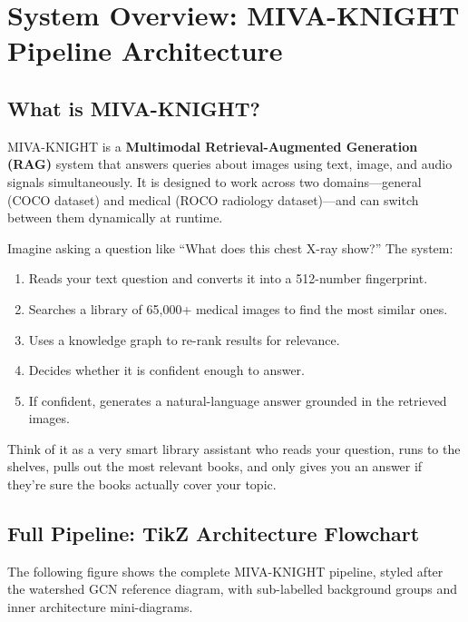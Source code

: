 \documentclass[12pt,a4paper]{article}
\newenvironment{plainbox}[1][Plain Language]{%
  \begin{tcolorbox}[
    enhanced, breakable,
    colback=lightpurplebox!40, colframe=purple!50,
    fonttitle=\bfseries\color{purple!70!black},
    title={#1},
    attach boxed title to top left={yshift=-2mm,xshift=5mm},
    boxed title style={colback=purple!40,colframe=purple!50}
  ]%
}{\end{tcolorbox}}
\begin{document}
\tableofcontents
\newpage

\section{System Overview: MIVA-KNIGHT Pipeline Architecture}
\label{sec:overview}

\subsection{What is MIVA-KNIGHT?}

MIVA-KNIGHT is a \textbf{Multimodal Retrieval-Augmented Generation (RAG)} system that
answers queries about images using text, image, and audio signals simultaneously. It is
designed to work across two domains---general (COCO dataset) and medical (ROCO radiology
dataset)---and can switch between them dynamically at runtime.

\begin{plainbox}[What Does MIVA-KNIGHT Do?]
Imagine asking a question like ``What does this chest X-ray show?'' The system:
\begin{enumerate}
  \item Reads your text question and converts it into a 512-number fingerprint.
  \item Searches a library of 65{,}000+ medical images to find the most similar ones.
  \item Uses a knowledge graph to re-rank results for relevance.
  \item Decides whether it is confident enough to answer.
  \item If confident, generates a natural-language answer grounded in the retrieved images.
\end{enumerate}
Think of it as a very smart library assistant who reads your question, runs to the shelves, pulls out the most relevant books, and only gives you an answer if they're sure the books actually cover your topic.
\end{plainbox}

\subsection{Full Pipeline: TikZ Architecture Flowchart}

The following figure shows the complete MIVA-KNIGHT pipeline, styled after the
watershed GCN reference diagram, with sub-labelled background groups and inner
architecture mini-diagrams.
\end{document}

